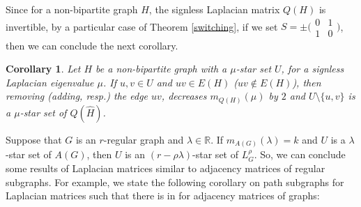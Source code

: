 \documentclass{amsart}
\newtheorem{corollary}[theorem]{Corollary}
\theoremstyle{remark}
\begin{document}
Since for a non-bipartite graph $H$, the signless Laplacian matrix $Q(H)$ is invertible, by a particular case of Theorem \ref{switching}, if we set $S=\pm\bigl( \begin{smallmatrix}
0 & 1 \\
1 & 0
\end{smallmatrix}\bigr)$, then we can conclude the next corollary.
\begin{corollary}
Let $H$ be a non-bipartite graph with a $\mu$-star set $U$, for a signless Laplacian eigenvalue  $\mu$. If $u,v\in U$ and $uv\in E(H)$
{\rm(}$uv\notin E(H)${\rm)}, then removing {\rm(}adding, resp.{\rm)} the edge $uv$, decreases $m_{Q(H)}(\mu)$ by $2$ and $U\setminus \{u,v\}$ is a $\mu$-star set of $Q(\widehat{H})$.
\end{corollary}

Suppose that $G$ is an $r$-regular graph and $\lambda\in\mathbb{R}$. If $m_{A(G)}(\lambda)=k$ and $U$ is a $\lambda$-star set  of $A(G)$, then $U$ is an $(r-\rho \lambda)$-star set of $L_{G}^{\rho}$. So, we can conclude some results of Laplacian matrices similar to adjacency matrices of regular subgraphs. For example, we state the following corollary on path subgraphs for Laplacian matrices such that there is in \cite{BK} for adjacency matrices of graphs:
\end{document}
